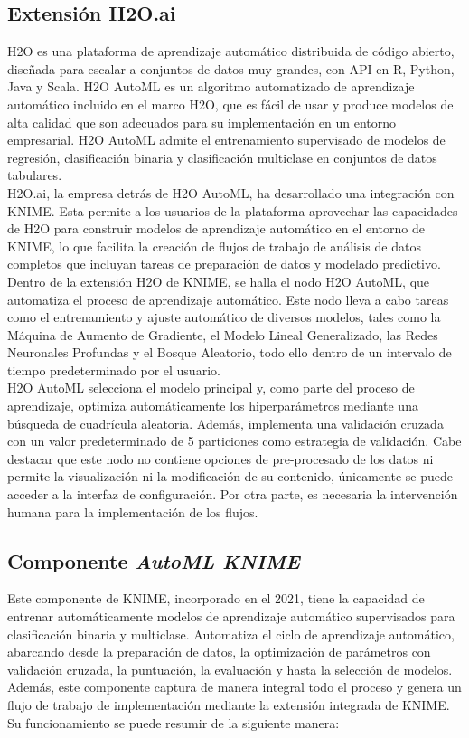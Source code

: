 \subsection{Extensión H2O.ai}
H2O es una plataforma de aprendizaje automático distribuida de código abierto, diseñada para escalar a conjuntos de datos muy grandes, con API en R, Python, Java y Scala. H2O AutoML \citep{ledell2020h2o} es un algoritmo automatizado de aprendizaje automático incluido en el marco H2O, que es fácil de usar y produce modelos de alta calidad que son adecuados para su implementación en un entorno empresarial. H2O AutoML admite el entrenamiento supervisado de modelos de regresión, clasificación binaria y clasificación multiclase en conjuntos de datos tabulares.\\
H2O.ai, la empresa detrás de H2O AutoML, ha desarrollado una integración con KNIME. Esta permite a los usuarios de la plataforma aprovechar las capacidades de H2O para construir modelos de aprendizaje automático en el entorno de KNIME, lo que facilita la creación de flujos de trabajo de análisis de datos completos que incluyan tareas de preparación de datos y modelado predictivo. Dentro de la extensión H2O de KNIME, se halla el nodo H2O AutoML, que automatiza el proceso de aprendizaje automático. Este nodo lleva a cabo tareas como el entrenamiento y ajuste automático de diversos modelos, tales como la Máquina de Aumento de Gradiente, el Modelo Lineal Generalizado, las Redes Neuronales Profundas y el Bosque Aleatorio, todo ello dentro de un intervalo de tiempo predeterminado por el usuario. \\
H2O AutoML selecciona el modelo principal y, como parte del proceso de aprendizaje, optimiza automáticamente los hiperparámetros mediante una búsqueda de cuadrícula aleatoria. Además, implementa una validación cruzada con un valor predeterminado de 5 particiones como estrategia de validación. Cabe destacar que este nodo no contiene opciones de pre-procesado de los datos ni permite la visualización ni la modificación de su contenido, únicamente se puede acceder a la interfaz de configuración. Por otra parte, es necesaria la intervención humana para la implementación de los flujos.

\subsection{Componente \textit{AutoML KNIME}}
Este componente de KNIME, incorporado en el 2021, tiene la capacidad de entrenar automáticamente modelos de aprendizaje automático supervisados para clasificación binaria y multiclase. Automatiza el ciclo de aprendizaje automático, abarcando desde la preparación de datos, la optimización de parámetros con validación cruzada, la puntuación, la evaluación y hasta la selección de modelos. Además, este componente captura de manera integral todo el proceso y genera un flujo de trabajo de implementación mediante la extensión integrada de KNIME. Su funcionamiento se puede resumir de la siguiente manera:

